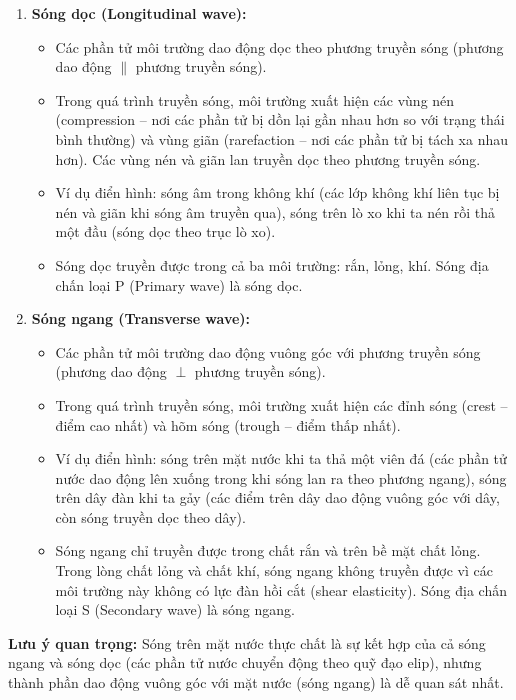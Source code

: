\begin{enumerate}
    \item \textbf{Sóng dọc (Longitudinal wave):}
    \begin{itemize}
        \item Các phần tử môi trường dao động dọc theo phương truyền sóng (phương dao động $\parallel$ phương truyền sóng).
        \item Trong quá trình truyền sóng, môi trường xuất hiện các vùng nén (compression – nơi các phần tử bị dồn lại gần nhau hơn so với trạng thái bình thường) và vùng giãn (rarefaction – nơi các phần tử bị tách xa nhau hơn). Các vùng nén và giãn lan truyền dọc theo phương truyền sóng.
        \item Ví dụ điển hình: sóng âm trong không khí (các lớp không khí liên tục bị nén và giãn khi sóng âm truyền qua), sóng trên lò xo khi ta nén rồi thả một đầu (sóng dọc theo trục lò xo).
        \item Sóng dọc truyền được trong cả ba môi trường: rắn, lỏng, khí. Sóng địa chấn loại P (Primary wave) là sóng dọc.
    \end{itemize}
    
    \item \textbf{Sóng ngang (Transverse wave):}
    \begin{itemize}
        \item Các phần tử môi trường dao động vuông góc với phương truyền sóng (phương dao động $\perp$ phương truyền sóng).
        \item Trong quá trình truyền sóng, môi trường xuất hiện các đỉnh sóng (crest – điểm cao nhất) và hõm sóng (trough – điểm thấp nhất).
        \item Ví dụ điển hình: sóng trên mặt nước khi ta thả một viên đá (các phần tử nước dao động lên xuống trong khi sóng lan ra theo phương ngang), sóng trên dây đàn khi ta gảy (các điểm trên dây dao động vuông góc với dây, còn sóng truyền dọc theo dây).
        \item Sóng ngang chỉ truyền được trong chất rắn và trên bề mặt chất lỏng. Trong lòng chất lỏng và chất khí, sóng ngang không truyền được vì các môi trường này không có lực đàn hồi cắt (shear elasticity). Sóng địa chấn loại S (Secondary wave) là sóng ngang.
    \end{itemize}
\end{enumerate}

\textbf{Lưu ý quan trọng:} Sóng trên mặt nước thực chất là sự kết hợp của cả sóng ngang và sóng dọc (các phần tử nước chuyển động theo quỹ đạo elip), nhưng thành phần dao động vuông góc với mặt nước (sóng ngang) là dễ quan sát nhất.

